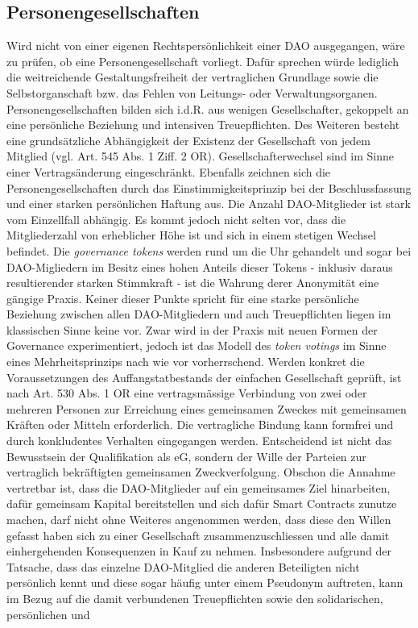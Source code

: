 \documentclass[a4paper,12pt]{report}
\begin{document}
	\subsection{Personengesellschaften}
	\startsubsection
	Wird nicht von einer eigenen Rechtspersönlichkeit einer DAO ausgegangen, wäre zu prüfen, ob eine Personengesellschaft vorliegt. Dafür sprechen würde lediglich die weitreichende Gestaltungsfreiheit der vertraglichen Grundlage sowie die Selbstorganschaft bzw. das Fehlen von Leitungs- oder Verwaltungsorganen. Personengesellschaften bilden sich i.d.R. aus wenigen Gesellschafter, gekoppelt an eine persönliche Beziehung und intensiven Treuepflichten. Des Weiteren besteht eine grundsätzliche Abhängigkeit der Existenz der Gesellschaft von jedem Mitglied (vgl. Art. 545 Abs. 1 Ziff. 2 OR). Gesellschafterwechsel sind im Sinne einer Vertragsänderung eingeschränkt. Ebenfalls zeichnen sich die Personengesellschaften durch das Einstimmigkeitsprinzip bei der Beschlussfassung und einer starken persönlichen Haftung aus. Die Anzahl DAO-Mitglieder ist stark vom Einzellfall abhängig. Es kommt jedoch nicht selten vor, dass die Mitgliederzahl von erheblicher Höhe ist und sich in einem stetigen Wechsel befindet. Die \textit{governance tokens} werden rund um die Uhr gehandelt und sogar bei DAO-Migliedern im Besitz eines hohen Anteils dieser Tokens - inklusiv daraus resultierender starken Stimmkraft - ist die Wahrung derer Anonymität eine gängige Praxis. Keiner dieser Punkte spricht für eine starke persönliche Beziehung zwischen allen DAO-Mitgliedern und auch Treuepflichten liegen im klassischen Sinne keine vor. Zwar wird in der Praxis mit neuen Formen der Governance experimentiert, jedoch ist das Modell des \textit{token votings} im Sinne eines Mehrheitsprinzips nach wie vor vorherrschend. Werden konkret die Voraussetzungen des Auffangstatbestands der einfachen Gesellschaft geprüft, ist nach Art. 530 Abs. 1 OR eine vertragsmässige Verbindung von zwei oder mehreren Personen zur Erreichung eines gemeinsamen Zweckes mit gemeinsamen Kräften oder Mitteln erforderlich. Die vertragliche Bindung kann formfrei und durch konkludentes Verhalten eingegangen werden. Entscheidend ist nicht das Bewusstsein der Qualifikation als eG, sondern der Wille der Parteien zur vertraglich bekräftigten gemeinsamen Zweckverfolgung. Obschon die Annahme vertretbar ist, dass die DAO-Mitglieder auf ein gemeinsames Ziel hinarbeiten, dafür gemeinsam Kapital bereitstellen und sich dafür Smart Contracts zunutze machen, darf nicht ohne Weiteres angenommen werden, dass diese den Willen gefasst haben sich zu einer Gesellschaft zusammenzuschliessen und alle damit einhergehenden Konsequenzen in Kauf zu nehmen. Insbesondere aufgrund der Tatsache, dass das einzelne DAO-Mitglied die anderen Beteiligten nicht persönlich kennt und diese sogar häufig unter einem Pseudonym auftreten, kann im Bezug auf die damit verbundenen Treuepflichten sowie den solidarischen, persönlichen und 
\end{document}
